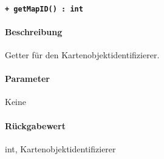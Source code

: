 \paragraph{\texttt{+ getMapID() : int}}%
\paragraph*{Beschreibung}
Getter für den Kartenobjektidentifizierer.
\paragraph*{Parameter}
Keine
\paragraph*{Rückgabewert}
int, Kartenobjektidentifizierer